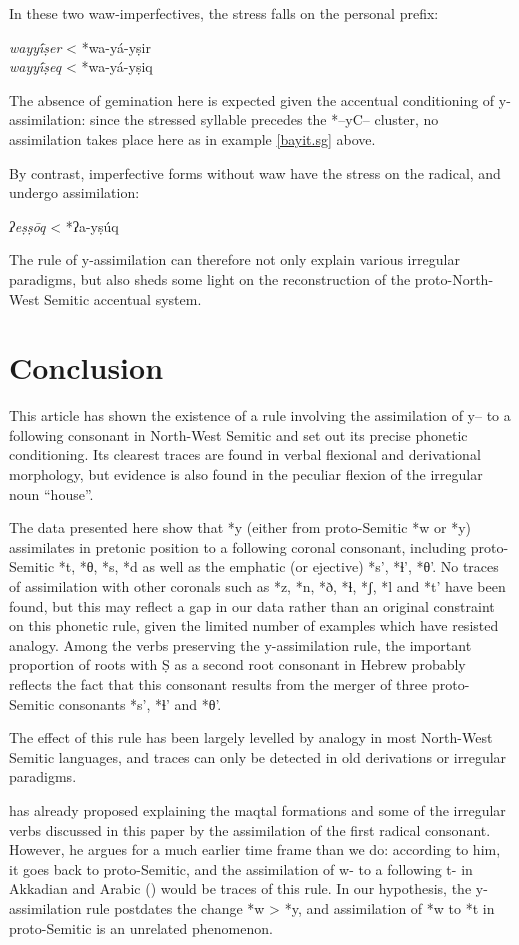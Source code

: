 \documentclass[oldfontcommands,oneside,a4paper,11pt]{article}
\newcommand{\forme}[1]{\textit{#1}}
\begin{document}
\begin{sloppypar}
In these two waw-imperfectives, the stress falls on the personal prefix:
\begin{exe} 
\ex \forme{wayyī́ṣer}  < *wa-yá-yṣir \\
  \forme{wayyī́ṣeq} < *wa-yá-yṣiq 
\end{exe}
The absence of gemination here is expected given the accentual conditioning of y-assimilation: since the stressed syllable precedes the *--yC-- cluster, no assimilation takes place here as in example \ref{bayit.sg} above. 

By contrast, imperfective forms without waw have the stress on the radical, and undergo assimilation:
\begin{exe} 
\ex \forme{ʔeṣṣōq} < *ʔa-yṣúq
\end{exe}
The rule of y-assimilation can therefore not only explain various irregular paradigms, but also sheds some light on the reconstruction of the proto-North-West Semitic accentual system.

\section{Conclusion}
 This article has shown the existence of a rule involving the assimilation of y-- to a following consonant in North-West Semitic and set out its precise phonetic conditioning. Its clearest traces are found in verbal flexional and derivational morphology, but evidence is also found  in the peculiar flexion of the irregular noun ``house''. 
 
 The data presented here show that *y (either from proto-Semitic *w or *y) assimilates in pretonic position to a following coronal consonant, including proto-Semitic *t, *θ, *s, *d as well as the emphatic (or ejective) *s', *ɬ', *θ'. No traces of assimilation with other coronals such as *z, *n, *ð, *ɬ, *ʃ, *l and *t' have been found, but this may reflect a gap in our data rather than an original constraint on this phonetic rule, given the limited number of examples which have resisted analogy. Among the verbs preserving the y-assimilation rule, the important proportion of roots with Ṣ as a second root consonant in Hebrew probably reflects the fact that this consonant results from the merger of three proto-Semitic consonants *s', *ɬ' and *θ'.
 
The effect of this rule has been largely levelled by analogy in most North-West Semitic languages, and traces can only be detected in old derivations or irregular paradigms.

	 \citet{huehnergard06} has already  proposed  explaining the maqtal formations and some of the irregular verbs discussed in this paper by the assimilation of the first radical consonant. However, he argues for a much earlier time frame than we do: according to him, it goes back to proto-Semitic, and the assimilation of w- to a following t- in  Akkadian and Arabic (\citealt[I:177]{brockelmann}) would be traces of this rule.  In  our hypothesis,  the y-assimilation rule postdates the change *w > *y, and assimilation of *w to *t in proto-Semitic is an unrelated phenomenon.
	 

\end{sloppypar}
\end{document}

